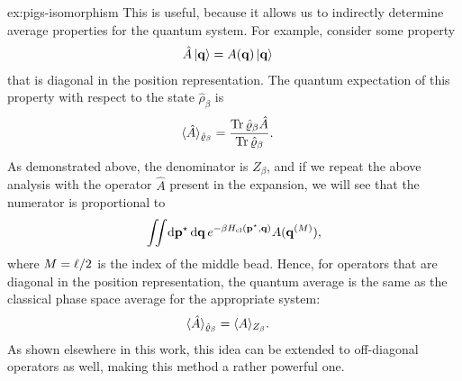 \begin{DefAnswer}{ex:pigs-isomorphism}
	This is useful, because it allows us to indirectly determine average properties for the quantum system.
	For example, consider some property
	\begin{align}
		\hat{A} \ket{\bm{\mathbf{q}}}
		&= A(\bm{\mathbf{q}}) \ket{\bm{\mathbf{q}}}
	\end{align}
	that is diagonal in the position representation.
	The quantum expectation of this property with respect to the state $\hat{\rho}_\beta$ is
	\begin{align}
		\langle \hat{A} \rangle_{\hat{\varrho}_\beta}
		&= \frac{\operatorname{Tr}{\hat{\varrho}_\beta \hat{A}}}{\operatorname{Tr}{\hat{\varrho}_\beta}}.
	\end{align}
	As demonstrated above, the denominator is $Z_\beta$, and if we repeat the above analysis with the operator $\hat{A}$ present in the expansion, we will see that the numerator is proportional to
	\begin{align}
		\iint\! \dif \fict{\vec{p}} \dif \vec{q} \, e^{-\beta \Hcl(\fict{\vec{p}}, \vec{q})} A(\vec{q}\bead{M}),
	\end{align}
	where $M = \ell / 2$ is the index of the middle bead.
	Hence, for operators that are diagonal in the position representation, the quantum average is the same as the classical phase space average for the appropriate system:
	\begin{align}
		\langle \hat{A} \rangle_{\hat{\varrho}_\beta}
		&= \langle A \rangle_{Z_\beta}.
	\end{align}
	As shown elsewhere in this work, this idea can be extended to off-diagonal operators as well, making this method a rather powerful one.
\end{DefAnswer}

